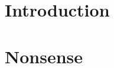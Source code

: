 \documentclass{article}
\begin{document}
\section{Introduction}
 
\lipsum[1]
 
\section{Nonsense}
 
\lipsum[2-4]
\end{document}
